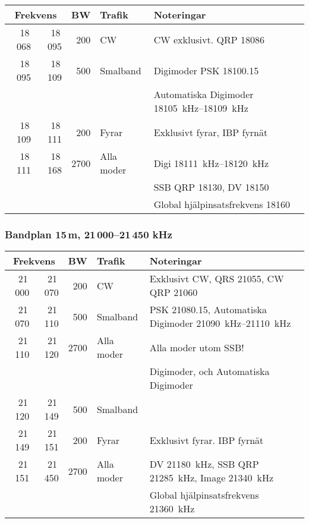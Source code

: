 \begin{tabular}{rrrll}
\multicolumn{2}{c}{\textbf{Frekvens}} & \textbf{BW} & \textbf{Trafik}
        & \textbf{Noteringar} \\ \hline
        
 18\,068 & 18\,095 & 200  & CW         & CW exklusivt. QRP \num{18086}                     \\ \hline
18\,095  & 18\,109 & 500  & Smalband   & Digimoder PSK \SI{18100,15}{}                     \\
         &         &      &            & Automatiska Digimoder \SIrange{18105}{18109}{kHz} \\ \hline
18\,109  & 18\,111 & 200  & Fyrar      & Exklusivt fyrar, IBP fyrnät                       \\ \hline
18\,111  & 18\,168 & 2700 & Alla moder & Digi \SIrange{18111}{18120}{kHz}                  \\
         &         &      &            & SSB QRP \num{18130}, DV \num{18150}               \\
         &         &      &            & Global hjälpinsatsfrekvens \num{18160}            \\ \hline
\end{tabular}

\subsubsection{Bandplan 15\,m, 21\,000--21\,450 kHz}

\begin{tabular}{rrrll}
\multicolumn{2}{c}{\textbf{Frekvens}} & \textbf{BW} & \textbf{Trafik} & \textbf{Noteringar} \\ \hline

21\,000 & 21\,070 & 200  & CW         & Exklusivt CW, QRS \num{21055}, CW QRP \num{21060}                     \\ \hline
21\,070 & 21\,110 & 500  & Smalband   & PSK \num{21080,15}, Automatiska Digimoder \SIrange{21090}{21110}{kHz} \\
21\,110 & 21\,120 & 2700 & Alla moder & Alla moder utom SSB!                                                  \\
        &         &      &            & Digimoder, och Automatiska Digimoder                                  \\ \hline
21\,120 & 21\,149 & 500  & Smalband   &                                                                       \\ \hline
21\,149 & 21\,151 & 200  & Fyrar      & Exklusivt fyrar. IBP fyrnät                                           \\ \hline
21\,151 & 21\,450 & 2700 & Alla moder & DV \SI{21180}{kHz}, SSB QRP \SI{21285}{kHz}, Image \SI{21340}{kHz}    \\
        &         &      &            & Global hjälpinsatsfrekvens \SI{21360}{kHz}                            \\ \hline
\end{tabular}

